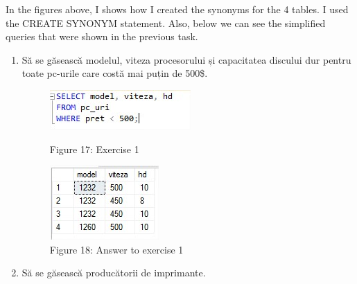 In the figures above, I shows how I created the synonyms for the 4 tables. I used the CREATE SYNONYM statement. Also, below we can see the simplified queries that were shown in the previous task.

\renewcommand{\labelenumi}{\arabic{enumi})}
\begin{enumerate}
	\item Să se găsească modelul, viteza procesorului și capacitatea discului dur pentru toate pc-urile care costă mai puțin de 500\$. 
	
\begin{figure}[H]
	\centering
		\includegraphics[width=\linewidth]{screens/21.jpg}
		\caption*{Figure 17: Exercise 1}
		\label{}
	\endminipage\hfill
		\includegraphics[width=\linewidth]{screens/21ans.jpg}
		\caption*{Figure 18: Answer to exercise 1}
	\endminipage
\end{figure}

	\item Să se găsească producătorii de imprimante.
	

\end{enumerate}
